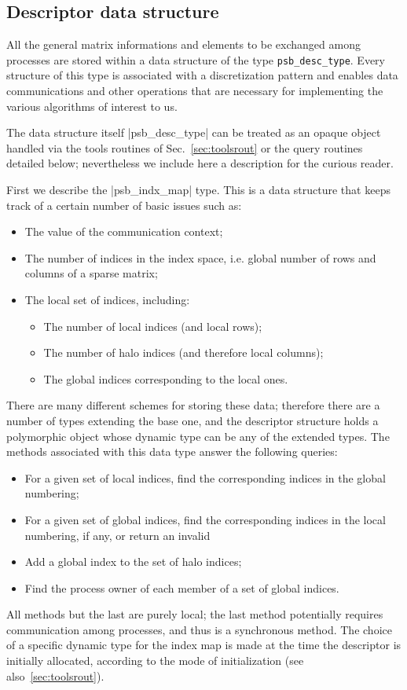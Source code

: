 \subsection{Descriptor data structure}
\label{sec:desc}
All the general matrix informations and elements to be
exchanged among processes are stored within a data structure of the
type \hypertarget{descdata}{{\tt psb\_desc\_type}}. 
Every structure of this type is associated with a discretization
pattern and enables data communications and other operations that are
necessary for implementing the various algorithms of interest to us. 

The data structure itself \fortinline|psb_desc_type| can be treated as an
opaque object handled via the   tools routines of
Sec.~\ref{sec:toolsrout} or the query routines detailed below;
nevertheless we include here a  description for the curious 
reader. 

First we describe the \fortinline|psb_indx_map| type. This is a data
structure that keeps track of a certain number of basic issues such
as:
\begin{itemize}
\item The value of the communication context;
\item The number of indices in the index space, i.e. global number of
  rows and columns of a sparse matrix;
\item The local set of indices, including:
\begin{itemize}
\item The number of local indices (and local rows);
\item The number of halo indices (and therefore local columns); 
\item The global indices corresponding to the local ones. 
\end{itemize}
\end{itemize}
There are many different schemes for storing these data; therefore
there are a number of types extending the base one, and the descriptor
structure holds a polymorphic object whose dynamic type can be any of
the extended  types. 
The methods associated with this data type answer the following
queries:
\begin{itemize}
\item For a given set of local indices, find the corresponding indices
  in the global numbering;
\item For a given set of global indices, find the corresponding
  indices in the local numbering, if any, or return an invalid 
\item Add a global index to the set of halo indices;
\item Find the process  owner of each member of a set of global
  indices.
\end{itemize}
All methods but the last are purely local; the last method potentially
requires communication among processes, and thus is a synchronous
method. The choice of a specific dynamic type for the index map is
made at the time the descriptor is initially allocated, according to
the mode of initialization (see also~\ref{sec:toolsrout}).


